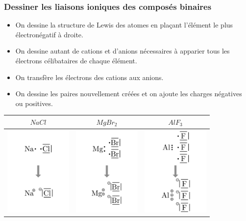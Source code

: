 \documentclass[
  11pt,
  french,
  a4paper,
  openany]{book}
\providecommand{\tightlist}{%
  \setlength{\itemsep}{0pt}\setlength{\parskip}{0pt}}
\begin{document}
\newpage

\hypertarget{dessiner-les-liaisons-ioniques-des-composuxe9s-binaires}{%
\subsubsection{Dessiner les liaisons ioniques des composés binaires}\label{dessiner-les-liaisons-ioniques-des-composuxe9s-binaires}}

\begin{itemize}
\tightlist
\item
  On dessine la structure de Lewis des atomes en plaçant l'élément le plus électronégatif à droite.
\item
  On dessine autant de cations et d'anions nécessaires à apparier tous les électrons célibataires de chaque élément.
\item
  On transfère les électrons des cations aux anions.
\item
  On dessine les paires nouvellement créées et on ajoute les charges négatives ou positives.
\end{itemize}

\begin{longtable}[]{@{}ccc@{}}
\toprule
\(NaCl\) & \(MgBr_2\) & \(AlF_3\)\tabularnewline
\midrule
\endhead
\includegraphics[width=9em,height=\textheight]{images/dessin-ioniques-NaCl.png} & \includegraphics[width=9em,height=\textheight]{images/dessin-ioniques-MgBr2.png} & \includegraphics[width=9em,height=\textheight]{images/dessin-ioniques-AlF3.png}\tabularnewline
\bottomrule
\end{longtable}
\end{document}

